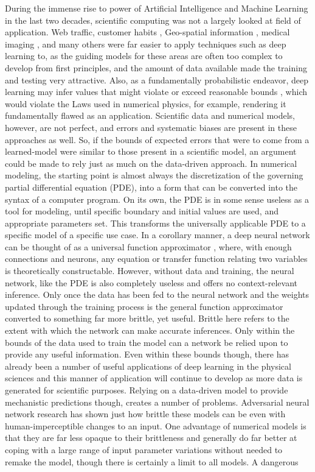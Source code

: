 \documentclass[3p]{elsarticle}
\begin{document}
During the immense rise to power of Artificial Intelligence and Machine Learning in the last two decades, scientific computing was not a largely looked at field of application. Web traffic\cite{Bu20092}, customer habits \cite{Vazquez201468}, Geo-spatial information \cite{Cheng201611}, medical imaging \cite{Litjens201760}, and many others were far easier to apply techniques such as deep learning to, as the guiding models for these areas are often too complex to develop from first principles, and the amount of data available made the training and testing very attractive. Also, as a fundamentally probabilistic endeavor, deep learning may infer values that might violate or exceed reasonable bounds \cite{Su2019828}, which would violate the Laws used in numerical physics, for example, rendering it fundamentally flawed as an application. Scientific data and numerical models, however, are not perfect, and errors and systematic biases are present in these approaches as well. So, if the bounds of expected errors that were to come from a learned-model were similar to those present in a scientific model, an argument could be made to rely just as much on the data-driven approach. In numerical modeling, the starting point is almost always the discretization of the governing partial differential equation (PDE), into a form that can be converted into the syntax of a computer program. On its own, the PDE is in some sense useless as a tool for modeling, until specific boundary and initial values are used, and appropriate parameters set. This transforms the universally applicable PDE to a specific model of a specific use case. In a corollary manner, a deep neural network can be thought of as a universal function approximator \cite{Hornik1991251}, where, with enough connections and neurons, any equation or transfer function relating two variables is theoretically constructable. However, without data and training, the neural network, like the PDE is also completely useless and offers no context-relevant inference. Only once the data has been fed to the neural network and the weights updated through the training process is the general function approximator converted to something far more brittle, yet useful. Brittle here refers to the extent with which the network can make accurate inferences. Only within the bounds of the data used to train the model can a network be relied upon to provide any useful information. Even within these bounds though, there has already been a number of useful applications of deep learning in the physical sciences \cite{raymond2020deep,montgomery2020shale,zhan2020deep,domel2021,raymond2020towards,collins2020acoustic,zhan2020prediction,liu2021time} and this manner of application will continue to develop as more data is generated for scientific purposes. Relying on a data-driven model to provide mechanistic predictions though, creates a number of problems. Adversarial neural network research \cite{Ganin2016} has shown just how brittle these models can be even with human-imperceptible changes to an input. One advantage of numerical models is that they are far less opaque to their brittleness and generally do far better at coping with a large range of input parameter variations without needed to remake the model, though there is certainly a limit to all models. A dangerous 
\end{document}
